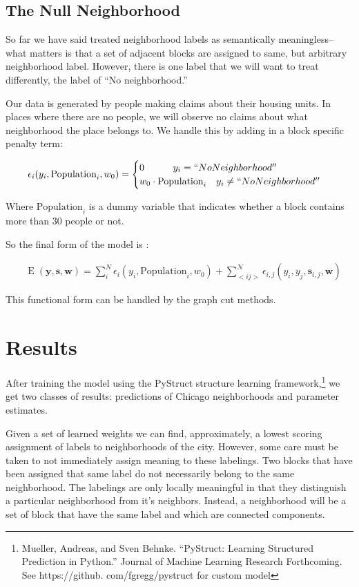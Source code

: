 \documentclass[12pt,letter]{article}\usepackage[]{graphicx}\usepackage[]{color}
\begin{document}
\subsection*{The Null Neighborhood}
So far we have said treated neighborhood labels as semantically
meaningless--what matters is that a set of adjacent blocks are
assigned to same, but arbitrary neighborhood label. However, there is
one label that we will want to treat differently, the label of ``No
neighborhood.'' 

Our data is generated by people making claims about
their housing units. In places where there are no people, we
will observe no claims about what neighborhood the place belongs
to. We handle this by adding in a block specific penalty term:

\begin{align}
\epsilon_{i}(y_i, \text{Population}_i, w_0) = \begin{cases}
    0 \quad\quad\quad y_i = ``No Neighborhood'' \\
    w_0\cdot\text{Population}_i \quad y_i \neq ``No Neighborhood'' \\
  \end{cases}
\end{align}

Where $\text{Population}_i$ is a dummy variable that indicates whether
a block contains more than 30 people or not.

So the final form of the model is :

\begin{align}
&\operatorname{E}(\mathbf{y}, \mathbf{s}, \mathbf{w}) =
  \sum_i^N\epsilon_{i}(y_i, \text{Population}_i, w_0) + \sum_{<i
    j>}^{\mathcal{N}}\epsilon_{i,j}(y_i, y_j, \mathbf{s}_{i,j}, \mathbf{w})  
\end{align}

This functional form can be handled by the graph cut methods.

\section*{Results}
After training the model using the PyStruct structure learning
framework,\footnote{Mueller, Andreas, and Sven Behnke. ``PyStruct:
  Learning Structured Prediction in Python.'' Journal of Machine
  Learning Research Forthcoming. See https://github.
  com/fgregg/pystruct for custom model} we get two classes of results:
predictions of Chicago neighborhoods and parameter estimates.

Given a set of learned weights we can find, approximately, a lowest
scoring assignment of labels to neighborhoods of the city. However,
some care must be taken to not immediately assign meaning to these
labelings. Two blocks that have been assigned that same label do not
necessarily belong to the same neighborhood. The labelings are only
locally meaningful in that they distinguish a particular neighborhood
from it’s neighbors. Instead, a neighborhood will be a set of block
that have the same label and which are connected components.  
\end{document}
